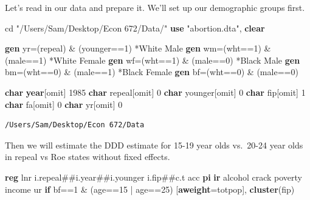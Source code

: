 \documentclass[
]{book}
\newenvironment{Shaded}{\begin{snugshade}}{\end{snugshade}}
\newcommand{\FunctionTok}[1]{\textcolor[rgb]{0.13,0.29,0.53}{\textbf{#1}}}
\newcommand{\KeywordTok}[1]{\textcolor[rgb]{0.13,0.29,0.53}{\textbf{#1}}}
\newcommand{\NormalTok}[1]{#1}
\newcommand{\StringTok}[1]{\textcolor[rgb]{0.31,0.60,0.02}{#1}}
\begin{document}
Let's read in our data and prepare it. We'll set up our demographic groups first.

\begin{Shaded}
\begin{Highlighting}[]
\NormalTok{cd }\StringTok{"/Users/Sam/Desktop/Econ 672/Data/"}
\KeywordTok{use} \StringTok{"abortion.dta"}\NormalTok{, }\KeywordTok{clear}

\KeywordTok{gen}\NormalTok{ yr=(repeal) \& (younger==1)}
\NormalTok{*White Male}
\KeywordTok{gen}\NormalTok{ wm=(wht==1) \& (male==1)}
\NormalTok{*White Female}
\KeywordTok{gen}\NormalTok{ wf=(wht==1) \& (male==0)}
\NormalTok{*Black Male}
\KeywordTok{gen}\NormalTok{ bm=(wht==0) \& (male==1)}
\NormalTok{*Black Female}
\KeywordTok{gen}\NormalTok{ bf=(wht==0) \& (male==0)}

\FunctionTok{char} \FunctionTok{year}\NormalTok{[omit] 1985}
\FunctionTok{char}\NormalTok{ repeal[omit] 0}
\FunctionTok{char}\NormalTok{ younger[omit] 0}
\FunctionTok{char}\NormalTok{ fip[omit] 1}
\FunctionTok{char}\NormalTok{ fa[omit] 0}
\FunctionTok{char}\NormalTok{ yr[omit] 0 }
\end{Highlighting}
\end{Shaded}

\begin{verbatim}
/Users/Sam/Desktop/Econ 672/Data
\end{verbatim}

Then we will estimate the DDD estimate for 15-19 year olds vs.~20-24 year olds in repeal vs Roe states without fixed effects.

\begin{Shaded}
\begin{Highlighting}[]
\KeywordTok{reg}\NormalTok{ lnr i.repeal\#\#i.year\#\#i.younger i.fip\#\#c.t acc }\KeywordTok{pi} \KeywordTok{ir}\NormalTok{ alcohol crack  poverty income ur }\KeywordTok{if}\NormalTok{ bf==1 \& (age==15 | age==25) [}\KeywordTok{aweight}\NormalTok{=totpop], }\KeywordTok{cluster}\NormalTok{(fip)}
\end{Highlighting}
\end{Shaded}
\end{document}
